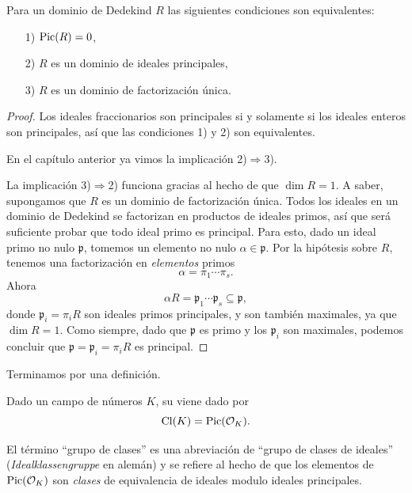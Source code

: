 \begin{teorema}
  Para un dominio de Dedekind $R$ las siguientes condiciones son equivalentes:
  \begin{itemize}
  \item[1)] $\operatorname{Pic} (R) = 0$,
  \item[2)] $R$ es un dominio de ideales principales,
  \item[3)] $R$ es un dominio de factorización única.
  \end{itemize}

  \begin{proof}
    Los ideales fraccionarios son principales si y solamente si los ideales
    enteros son principales, así que las condiciones 1) y 2) son
    equivalentes.

    En el capítulo anterior ya vimos la implicación 2)$\Rightarrow$3).

    La implicación 3)$\Rightarrow$2) funciona gracias al hecho de que
    $\dim R = 1$. A saber, supongamos que $R$ es un dominio de factorización
    única. Todos los ideales en un dominio de Dedekind se factorizan en
    productos de ideales primos, así que será suficiente probar que todo ideal
    primo es principal. Para esto, dado un ideal primo no nulo $\mathfrak{p}$,
    tomemos un elemento no nulo $\alpha \in \mathfrak{p}$. Por la hipótesis
    sobre $R$, tenemos una factorización en \emph{elementos} primos
    $$\alpha = \pi_1 \cdots \pi_s.$$
    Ahora
    $$\alpha R = \mathfrak{p}_1\cdots\mathfrak{p}_s \subseteq \mathfrak{p},$$
    donde $\mathfrak{p}_i = \pi_i R$ son ideales primos principales, y son
    también maximales, ya que $\dim R = 1$.
    Como siempre, dado que $\mathfrak{p}$ es primo y los $\mathfrak{p}_i$ son
    maximales, podemos concluir que $\mathfrak{p} = \mathfrak{p}_i = \pi_i R$
    es principal.
  \end{proof}
\end{teorema}

Terminamos por una definición.

\begin{definicion}
  Dado un campo de números $K$, su  viene dado por
  $$\operatorname{Cl} (K) = \operatorname{Pic} (\mathcal{O}_K).$$
\end{definicion}

El término ``grupo de clases'' es una abreviación de ``grupo de clases
de ideales'' (\emph{Idealklassengruppe} en alemán) y se refiere al hecho de que
los elementos de $\operatorname{Pic} (\mathcal{O}_K)$ son \emph{clases} de equivalencia de ideales
modulo ideales principales.

